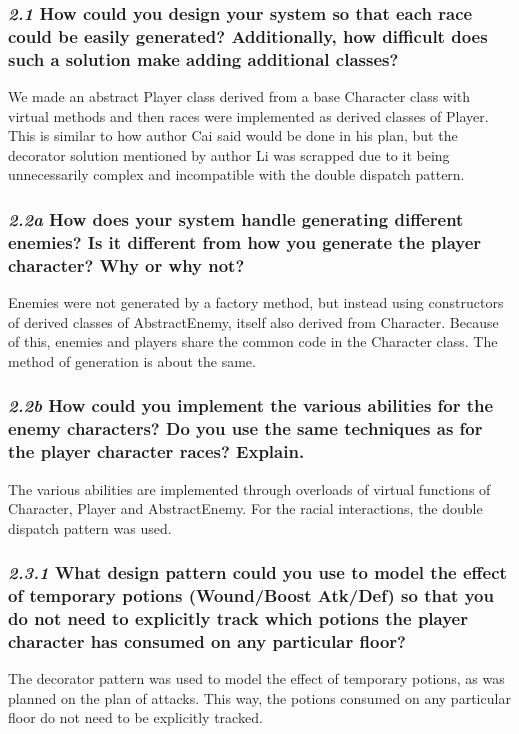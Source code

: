 \documentclass{article}
\begin{document}
\subsubsection*{\textit{2.1} How could you design your system so that each race could be easily generated? Additionally, how difficult does such a solution make adding additional classes?}

We made an abstract Player class derived from a base Character class with virtual methods and then races were implemented as derived classes of Player. This is similar to how author Cai said would be done in his plan, but the decorator solution mentioned by author Li was scrapped due to it being unnecessarily complex and incompatible with the double dispatch pattern. 

\subsubsection*{\textit{2.2a} How does your system handle generating different enemies? Is it different from how you generate the player character? Why or why not?}

Enemies were not generated by a factory method, but instead using constructors of derived classes of AbstractEnemy, itself also derived from Character. Because of this, enemies and players share the common code in the Character class. The method of generation is about the same.

\subsubsection*{\textit{2.2b} How could you implement the various abilities for the enemy characters? Do you use the same techniques as for the player character races? Explain.}

The various abilities are implemented through overloads of virtual functions of Character, Player and AbstractEnemy. For the racial interactions, the double dispatch pattern was used.

\subsubsection*{\textit{2.3.1} What design pattern could you use to model the effect of temporary potions (Wound/Boost Atk/Def) so that you do not need to explicitly track which potions the player character has consumed on any particular floor?}

The decorator pattern was used to model the effect of temporary potions, as was planned on the plan of attacks. This way, the potions consumed on any particular floor do not need to be explicitly tracked.
\end{document}
